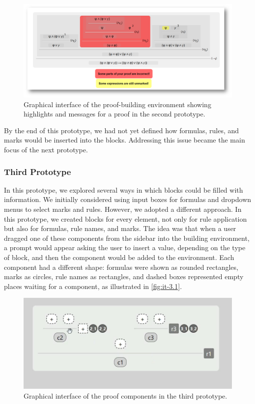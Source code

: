 \begin{figure}[h]
    \centering
    \includegraphics[width=0.95\linewidth]{Chapters/Figures/image5.png}
    \caption{Graphical interface of the proof-building environment showing highlights and messages for a proof in the second prototype.}
    \label{fig:it-2.3}
\end{figure}

By the end of this prototype, we had not yet defined how formulas, rules, and marks would be inserted into the blocks. Addressing this issue became the main focus of the next prototype.

\subsubsection{Third Prototype}

In this prototype, we explored several ways in which blocks could be filled with information. We initially considered using input boxes for formulas and dropdown menus to select marks and rules. However, we adopted a different approach. In this prototype, we created blocks for every element, not only for rule application but also for formulas, rule names, and marks. The idea was that when a user dragged one of these components from the sidebar into the building environment, a prompt would appear asking the user to insert a value, depending on the type of block, and then the component would be added to the environment. Each component had a different shape: formulas were shown as rounded rectangles, marks as circles, rule names as rectangles, and dashed boxes represented empty places waiting for a component, as illustrated in \autoref{fig:it-3.1}.

\begin{figure}[h]
    \centering
    \includegraphics[width=0.72\linewidth]{Chapters/Figures/image1.png}
    \caption{Graphical interface of the proof components in the third prototype.}
    \label{fig:it-3.1}
\end{figure}

